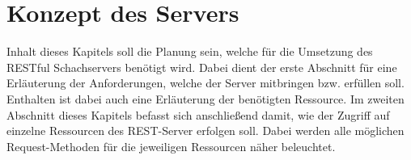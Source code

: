 
\chapter{Konzept des Servers}
Inhalt dieses Kapitels soll die Planung sein, welche für die Umsetzung des RESTful Schachservers benötigt wird. Dabei dient der erste Abschnitt für eine Erläuterung der Anforderungen, welche der Server mitbringen bzw. erfüllen soll. Enthalten ist dabei auch eine Erläuterung der benötigten Ressource. Im zweiten Abschnitt dieses Kapitels befasst sich anschließend damit, wie der Zugriff auf einzelne Ressourcen des REST-Server erfolgen soll. Dabei werden alle möglichen Request-Methoden für die jeweiligen Ressourcen näher beleuchtet.

